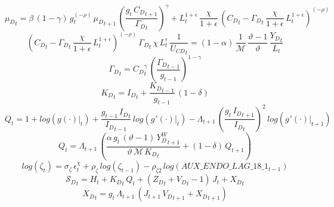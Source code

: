 \documentclass[10pt,a4paper]{article}
\begin{document}
\begin{dmath}
{{\mu}_{D}}_{t}=\beta\, \left(1-\gamma\right)\, {g}_{t}^{\left(-\rho\right)}\, {{\mu}_{D}}_{t+1}\, \left(\frac{{g}_{t}\, {C_D}_{t+1}}{{\Gamma_D}_{t}}\right)^{\gamma}+{L}_{t}^{1+\epsilon}\, \frac{\chi}{1+\epsilon}\, \left({C_D}_{t}-{\Gamma_D}_{t}\, \frac{\chi}{1+\epsilon}\, {L}_{t}^{1+\epsilon}\right)^{\left(-\rho\right)}
\end{dmath}
\begin{dmath}
\left({C_D}_{t}-{\Gamma_D}_{t}\, \frac{\chi}{1+\epsilon}\, {L}_{t}^{1+\epsilon}\right)^{\left(-\rho\right)}\, {\Gamma_D}_{t}\, \chi\, {L}_{t}^{\epsilon}\, \frac{1}{{U_{CD}}_{t}}=\left(1-\alpha\right)\, \frac{1}{\mathcal{M}}\, \frac{\vartheta-1}{\vartheta}\, \frac{{Y_D}_{t}}{{L}_{t}}
\end{dmath}
\begin{dmath}
{\Gamma_D}_{t}={C_D}_{t}^{\gamma}\, \left(\frac{{\Gamma_D}_{t-1}}{{g}_{t-1}}\right)^{1-\gamma}
\end{dmath}
\begin{dmath}
{K_D}_{t}={I_D}_{t}+\frac{{K_D}_{t-1}}{{g}_{t-1}}\, \left(1-\delta\right)
\end{dmath}
\begin{dmath}
{Q}_{t}=1+log\left({\left.       g\left( \cdot \right)            \right|}_{t}\right)+\frac{{g}_{t-1}\, {I_D}_{t}}{{I_D}_{t-1}}\, log\left({\left.       g^‎{\prime}\left( \cdot \right)   \right|}_{t}\right)-{\Lambda}_{t+1}\, \left(\frac{{g}_{t}\, {I_D}_{t+1}}{{I_D}_{t}}\right)^{2}\, log\left({\left.       g^‎{\prime}\left( \cdot \right)   \right|}_{t+1}\right)
\end{dmath}
\begin{dmath}
{Q}_{t}={\Lambda}_{t+1}\, \left(\frac{\alpha\, {g}_{t}\, \left(\vartheta-1\right)\, {Y^W_D}_{t+1}}{\vartheta\, \mathcal{M}\, {K_D}_{t}}+\left(1-\delta\right)\, {Q}_{t+1}\right)
\end{dmath}
\begin{dmath}
log\left({\zeta}_{t}\right)={\sigma}_{\zeta}\, {\epsilon}^{\chi}_{t}+{\rho}_{\zeta}\, log\left({\zeta}_{t-1}\right)-{\rho}_{\zeta2}\, log\left(AUX\_ENDO\_LAG\_18\_1_{t-1}\right)
\end{dmath}
\begin{dmath}
{\mathcal{S}_{D}}_{t}={H}_{t}+{K_D}_{t}\, {Q}_{t}+\left({Z_D}_{t}+{V_D}_{t}-1\right)\, {J}_{t}+{X_D}_{t}
\end{dmath}
\begin{dmath}
{X_D}_{t}={g}_{t}\, {\Lambda}_{t+1}\, \left({J}_{t+1}\, {V_D}_{t+1}+{X_D}_{t+1}\right)
\end{dmath}
\end{document}
